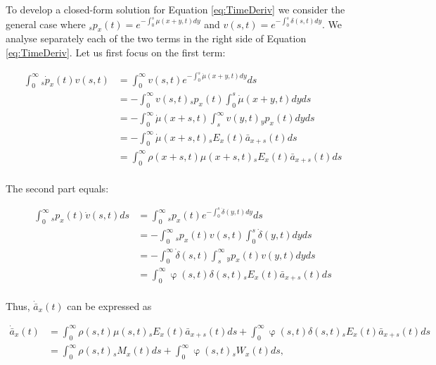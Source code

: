 \documentclass[12pt]{article}
\begin{document}
To develop a closed-form solution for Equation \ref{eq:TimeDeriv} we consider the general case where $_sp_x(t)=e^{-\int_{0}^{s}\mu(x+y,t)dy}$ and ${v}(s,t)=e^{-\int_{0}^{s}\delta(s,t)dy}$. We analyse separately each of the two terms in the right side of Equation \ref{eq:TimeDeriv}. Let us first focus on the first term:


\begin{equation}\label{eq:TimeDerivP1}
\begin{split}
\int_0^\infty {}_s\dot{p}_x(t) v(s,t) &= \int_0^\infty   v(s,t) e^{-\int_0^{s}\dot{\mu}(x+y,t)dy}ds\\
&= -\int_0^\infty   v(s,t) {}_sp_x(t)\int_0^{s}\dot{\mu}(x+y,t)dyds\\
&= -\int_0^\infty  \dot{\mu}(x+s,t) \int_s^{\infty} v(y,t) {}_yp_x(t) dyds\\
&= - \int_0^\infty \dot{\mu}(x+s,t)   {}_sE_x(t) \bar{a} _{x+s}(t) ds\\
&= \int_0^\infty \rho(x+s,t) \mu(x+s,t)   {}_sE_x(t) \bar{a} _{x+s}(t) ds\\
\end{split}
\end{equation}


The second part equals:

\begin{equation}\label{eq:TimeDerivP2}
\begin{split}
\int_0^\infty {}_sp_x(t) \dot{v}(s,t)ds &= \int_0^\infty {}_sp_x(t)  e^{-\int_0^{s}\dot{\delta}(y,t)dy}ds\\
&= -\int_0^\infty {}_sp_x(t) v(s,t) \int_0^{s}\dot{\delta}(y,t)dy ds\\
&= -\int_0^\infty  \dot{\delta}(s,t)\int_s^{\infty} {}_yp_x(t) v(y,t) dy ds\\
&= \int_0^\infty  \upvarphi(s,t) \delta(s,t)  {}_sE_x(t) \bar{a} _{x+s}(t) ds\\
\end{split}
\end{equation}


Thus, $\dot{\bar{a}} _x(t)$ can be expressed as


\begin{equation}\label{eq:TimeDerivP3}
\begin{split}
\dot{\bar{a}}_{x}(t) &=  \int_0^\infty \rho(s,t) \mu(s,t){}_sE_x(t) \bar{a}_{x+s}(t) ds +\int_0^\infty  \upvarphi(s,t) \delta(s,t)  {}_sE_x(t) \bar{a}_{x+s}(t) ds\\
&= \int_0^\infty \rho(s,t) {}_sM_x(t)  ds +\int_0^\infty  \upvarphi(s,t) {}_sW_x(t)  ds,
\end{split}
\end{equation}
\end{document}
